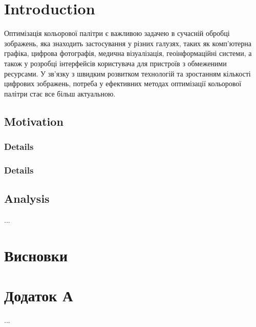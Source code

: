 \documentclass[
14pt,
candidate, %
subf, %
]{article}
\begin{document}




\newpage



\tableofcontents

\newpage




\section{Introduction}

Оптимізація кольорової палітри є важливою задачею в сучасній обробці
зображень, яка знаходить застосування у різних галузях, таких як комп'ютерна
графіка, цифрова фотографія, медична візуалізація, геоінформаційні системи, а
також у розробці інтерфейсів користувача для пристроїв з обмеженими
ресурсами. У зв'язку з швидким розвитком технологій та зростанням кількості
цифрових зображень, потреба у ефективних методах оптимізації кольорової
палітри стає все більш актуальною.

\subsection{Motivation}

\cite{linal}

\subsubsection{Details}

\subsubsection{Details}

\subsection{Analysis}

...

\newpage

\section*{Висновки}

\newpage




\newpage

\appendix
\section*{Додаток А}
...
\end{document}
